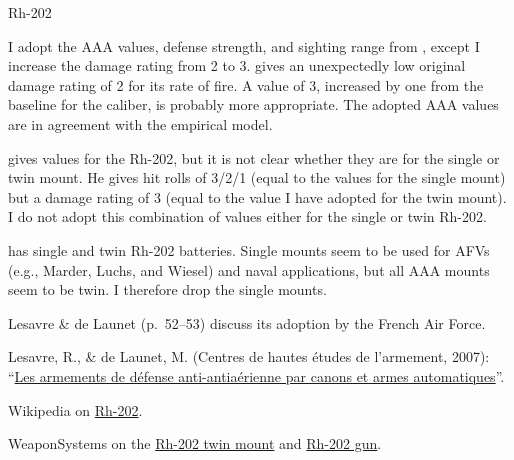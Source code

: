 \begin{withcounters}
{        

        Rh-202 


        I adopt the AAA values, defense strength, and sighting range from {\AirStr}, except I increase the damage rating from 2 to 3.
        {\AirStr} gives an unexpectedly low original damage rating of 2 for its rate of fire. A value of 3, increased by one from the baseline for the caliber, is probably more appropriate.
        The adopted AAA values are in agreement with the empirical model.

        {\MP} gives values for the Rh-202, but it is not clear whether they are for the single or twin mount. He gives hit rolls of 3/2/1 (equal to the {\AirStr} values for the single mount) but a damage rating of 3 (equal to the value I have adopted for the twin mount). I do not adopt this combination of values either for the single or twin Rh-202.

        {\AirStr} has single and twin Rh-202 batteries.
        Single mounts seem to be used for AFVs (e.g., Marder, Luchs, and Wiesel) and naval applications, but all AAA mounts seem to be twin. I therefore drop the single mounts.

        Lesavre \& de Launet (p.~52--53) discuss its adoption by the French Air Force.

        \begin{notesources}
            \item Lesavre, R., \& de Launet, M. (\foreignlanguage{french}{Centres de hautes études de l'armement}, 2007): “\href{https://www.yumpu.com/fr/document/view/16630048/les-armements-de-defense-antiaerienne-souvenirs-de-la-}{\foreignlanguage{french}{Les armements de défense anti-antiaérienne par canons et armes automatiques}}”.
            \item Wikipedia on \href{https://en.wikipedia.org/wiki/Rheinmetall_Mk_20_Rh-202}{Rh-202}.
            \item WeaponSystems on the \href{https://weaponsystems.net/system/937-Rh-202}{Rh-202 twin mount} and \href{https://weaponsystems.net/system/415-20mm+Rheinmetall+Rh-202}{Rh-202 gun}.
        \end{notesources}
    }


\end{withcounters}
